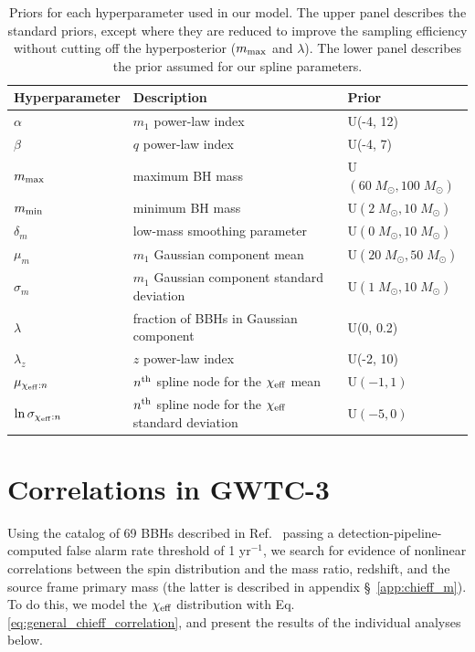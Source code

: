 \documentclass[%
 reprint,
 amsmath,amssymb,
 aps,
 prd,
]{revtex4-2}
\newcommand{\chieff}{\chi_{\rm eff}}
\newcommand{\Msun}{\;M_\odot}
\newcommand{\rednote}[1]{{\color{Red} #1}}
\begin{document}
\renewcommand{\arraystretch}{1.3}
\renewcommand{\tabcolsep}{0.3cm}
\begin{table}
    \centering
    \begin{tabular}{|l||ll|}
       \hline Hyperparameter & Description & Prior \\
       \hline $\alpha$ & $m_1$ power-law index & U(-4, 12) \\
       $\beta$ & $q$ power-law index & U(-4, 7) \\
       $m_{\rm max}$ & maximum BH mass & U$(60\Msun, 100\Msun)$ \\
       $m_{\rm min}$ & minimum BH mass & U$(2\Msun, 10\Msun)$ \\
       $\delta_m$ & low-mass smoothing parameter & U$(0\Msun, 10\Msun)$ \\
       $\mu_{m}$ & $m_1$ Gaussian component mean & U$(20\Msun, 50\Msun)$ \\
       $\sigma_{m}$ & $m_1$ Gaussian component standard deviation  & U$(1\Msun, 10\Msun)$ \\
       $\lambda$ & fraction of BBHs in Gaussian component & U(0, 0.2) \\
       $\lambda_z$ & $z$ power-law index & U(-2, 10) \\
       \hline $\mu_{\chieff:n}$ & $n^{\rm th}$ spline node for the $\chieff$ mean & U$(-1,1)$ \\
       $\ln\sigma_{\chieff:n}$ & $n^{\rm th}$ spline node for the $\chieff$ standard deviation & U$(-5,0)$
       \\ \hline

    \end{tabular}
    \caption{Priors for each hyperparameter used in our model. The upper panel describes the standard priors, except where they are reduced to improve the sampling efficiency without cutting off the hyperposterior ($m_{\rm max}$ and $\lambda$). The lower panel describes the prior assumed for our spline parameters.}
    \label{tab:prior_table}
\end{table}

 
\section{Correlations in \ac{GWTC-3}}
\label{sec:GWTC3_results}

Using the catalog of 69 BBHs described in Ref.~\cite{KAGRA:2021duu}  passing a detection-pipeline-computed false alarm rate threshold of 1 yr${}^{-1}$, we search for evidence of nonlinear correlations between the spin distribution and the mass ratio, redshift, and the source frame primary mass (the latter is described in appendix \S~\ref{app:chieff_m}). %
To do this, we model the $\chieff$ distribution with Eq. \ref{eq:general_chieff_correlation}, and present the results of the individual analyses below.
\end{document}
